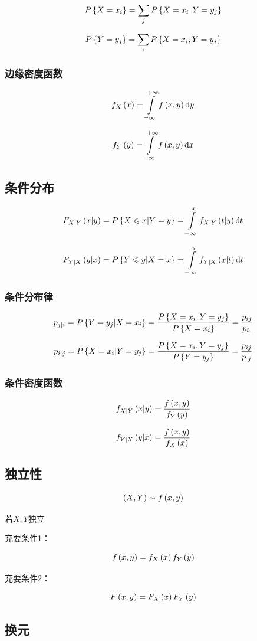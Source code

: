 \documentclass{article}
\begin{document}
\[P\left\{X=x_i\right\}=\sum_jP\left\{X=x_i,Y=y_j\right\}\]

\[P\left\{Y=y_j\right\}=\sum_iP\left\{X=x_i,Y=y_j\right\}\]

\subsubsection{边缘密度函数}

\[f_X\left(x\right)=\int\limits_{-\infty}^{+\infty} f\left(x,y\right)\mathrm d y\]

\[f_Y\left(y\right)=\int\limits_{-\infty}^{+\infty} f\left(x,y\right)\mathrm d x\]

\subsection{条件分布}

\[F_{X|Y}\left(x|y\right)=P\left\{X\leqslant x|Y=y\right\}=\int\limits_{-\infty}^x f_{X|Y}\left(t|y\right)\mathrm d t\]

\[F_{Y|X}\left(y|x\right)=P\left\{Y\leqslant y|X=x\right\}=\int\limits_{-\infty}^y f_{Y|X}\left(x|t\right)\mathrm d t\]

\subsubsection{条件分布律}

\[p_{j|i}=P\left\{Y=y_j|X=x_i\right\}=\frac{P\left\{X=x_i,Y=y_j\right\}}{P\left\{X=x_i\right\}}=\frac{p_{ij}}{p_{i\cdot}}\]

\[p_{i|j}=P\left\{X=x_i|Y=y_j\right\}=\frac{P\left\{X=x_i,Y=y_j\right\}}{P\left\{Y=y_j\right\}}=\frac{p_{ij}}{p_{\cdot j}}\]

\subsubsection{条件密度函数}

\[f_{X|Y}\left(x|y\right)=\frac{f\left(x,y\right)}{f_Y\left(y\right)}\]

\[f_{Y|X}\left(y|x\right)=\frac{f\left(x,y\right)}{f_X\left(x\right)}\]

\subsection{独立性}

\[\left(X,Y\right)\sim f\left(x,y\right)\]

若$X,Y$独立

充要条件1：

\[f\left(x,y\right)=f_X\left(x\right)f_Y\left(y\right)\]

充要条件2：

\[F\left(x,y\right)=F_X\left(x\right)F_Y\left(y\right)\]

\subsection{换元}
\end{document}
